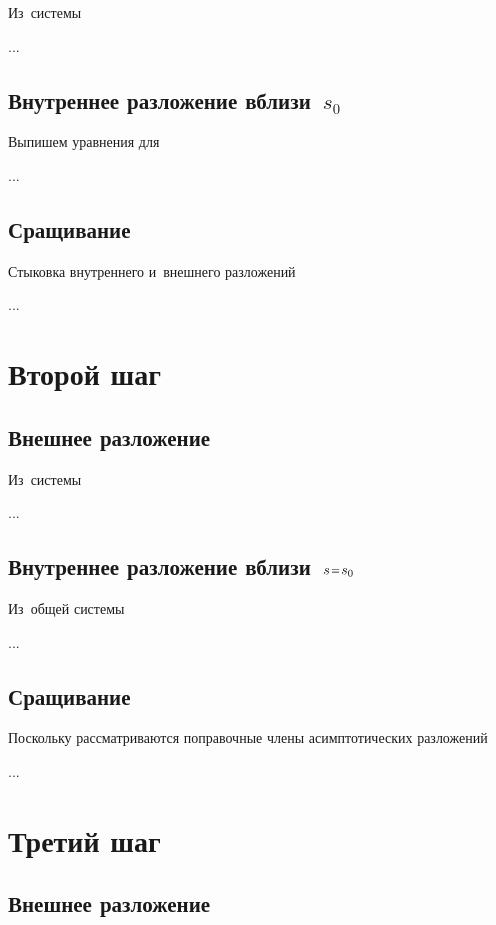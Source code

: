 \begin{otherlanguage}{russian}
Из~системы

...

\subsection*{Внутреннее разложение вблизи~$s_0$}

Выпишем уравнения для

...

\subsection*{Сращивание}

Стыковка внутреннего и~внешнего разложений

...



\section{Второй шаг}

\subsection*{Внешнее разложение}

Из~системы

...

\subsection*{Внутреннее разложение вблизи~${s \narroweq s_0}$}

Из~общей системы

...

\subsection*{Сращивание}

Поскольку рассматриваются поправочные члены асимптотических разложений

...



\section{Третий шаг}

\subsection*{Внешнее разложение}


\end{otherlanguage}

